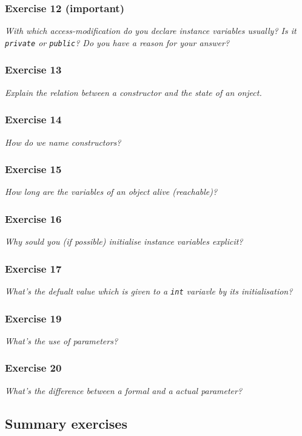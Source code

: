 \subsubsection*{Exercise 12 (important)}
\textit{With which access-modification do you declare instance variables
	usually? Is it \lstinline{private} or \lstinline{public}? Do you
	have a reason for your answer?}\\

\subsubsection*{Exercise 13}
\textit{Explain the relation between a constructor and the state of an 
	onject.}\\

\subsubsection*{Exercise 14}
\textit{How do we name constructors?}\\

\subsubsection*{Exercise 15}
\textit{How long are the variables of an object alive (reachable)?}\\

\subsubsection*{Exercise 16}
\textit{Why sould you (if possible) initialise instance variables explicit?}\\

\subsubsection*{Exercise 17}
\textit{What's the defualt value which is given to a \lstinline{int} variavle
	by its initialisation?}\\

\subsubsection*{Exercise 19}
\textit{What's the use of parameters?}\\

\subsubsection*{Exercise 20}
\textit{What's the difference between a formal and a actual parameter?}\\


\subsection{Summary exercises}

